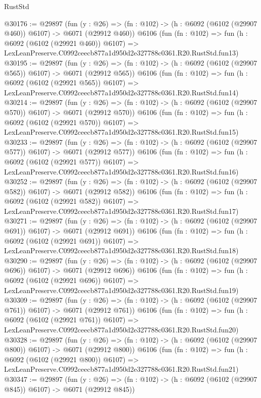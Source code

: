 \begin{lexlean}{RustStd}
\begin{coremodule}
@30176 := @29897
    (fun (y : @26) => (fn : @102) -> (h : @6092 (@6102 (@29907 @460)) @6107) -> @6071 (@29912 @460))
    @6106
    (fun (fn : @102) =>
    fun (h : @6092 (@6102 (@29921 @460)) @6107) =>
    LexLeanPreserve.C0992ceecb877a1d950d2e327788c0361.R20.RustStd.fun13)
@30195 := @29897
    (fun (y : @26) => (fn : @102) -> (h : @6092 (@6102 (@29907 @565)) @6107) -> @6071 (@29912 @565))
    @6106
    (fun (fn : @102) =>
    fun (h : @6092 (@6102 (@29921 @565)) @6107) =>
    LexLeanPreserve.C0992ceecb877a1d950d2e327788c0361.R20.RustStd.fun14)
@30214 := @29897
    (fun (y : @26) => (fn : @102) -> (h : @6092 (@6102 (@29907 @570)) @6107) -> @6071 (@29912 @570))
    @6106
    (fun (fn : @102) =>
    fun (h : @6092 (@6102 (@29921 @570)) @6107) =>
    LexLeanPreserve.C0992ceecb877a1d950d2e327788c0361.R20.RustStd.fun15)
@30233 := @29897
    (fun (y : @26) => (fn : @102) -> (h : @6092 (@6102 (@29907 @577)) @6107) -> @6071 (@29912 @577))
    @6106
    (fun (fn : @102) =>
    fun (h : @6092 (@6102 (@29921 @577)) @6107) =>
    LexLeanPreserve.C0992ceecb877a1d950d2e327788c0361.R20.RustStd.fun16)
@30252 := @29897
    (fun (y : @26) => (fn : @102) -> (h : @6092 (@6102 (@29907 @582)) @6107) -> @6071 (@29912 @582))
    @6106
    (fun (fn : @102) =>
    fun (h : @6092 (@6102 (@29921 @582)) @6107) =>
    LexLeanPreserve.C0992ceecb877a1d950d2e327788c0361.R20.RustStd.fun17)
@30271 := @29897
    (fun (y : @26) => (fn : @102) -> (h : @6092 (@6102 (@29907 @691)) @6107) -> @6071 (@29912 @691))
    @6106
    (fun (fn : @102) =>
    fun (h : @6092 (@6102 (@29921 @691)) @6107) =>
    LexLeanPreserve.C0992ceecb877a1d950d2e327788c0361.R20.RustStd.fun18)
@30290 := @29897
    (fun (y : @26) => (fn : @102) -> (h : @6092 (@6102 (@29907 @696)) @6107) -> @6071 (@29912 @696))
    @6106
    (fun (fn : @102) =>
    fun (h : @6092 (@6102 (@29921 @696)) @6107) =>
    LexLeanPreserve.C0992ceecb877a1d950d2e327788c0361.R20.RustStd.fun19)
@30309 := @29897
    (fun (y : @26) => (fn : @102) -> (h : @6092 (@6102 (@29907 @761)) @6107) -> @6071 (@29912 @761))
    @6106
    (fun (fn : @102) =>
    fun (h : @6092 (@6102 (@29921 @761)) @6107) =>
    LexLeanPreserve.C0992ceecb877a1d950d2e327788c0361.R20.RustStd.fun20)
@30328 := @29897
    (fun (y : @26) => (fn : @102) -> (h : @6092 (@6102 (@29907 @800)) @6107) -> @6071 (@29912 @800))
    @6106
    (fun (fn : @102) =>
    fun (h : @6092 (@6102 (@29921 @800)) @6107) =>
    LexLeanPreserve.C0992ceecb877a1d950d2e327788c0361.R20.RustStd.fun21)
@30347 := @29897
    (fun (y : @26) => (fn : @102) -> (h : @6092 (@6102 (@29907 @845)) @6107) -> @6071 (@29912 @845))

\end{coremodule}
\end{lexlean}
